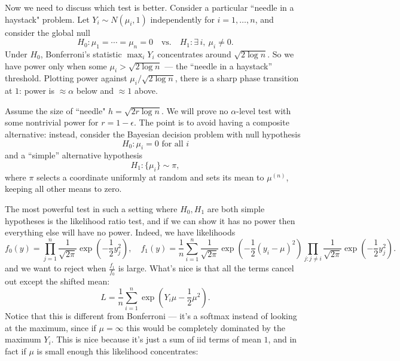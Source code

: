 Now we need to discuss which test is better. Consider a particular ``needle in a haystack" problem. 
Let $Y_i \sim N(\mu_i, 1)$ independently for $i = 1, \ldots, n$, and consider the global null
\[
H_0 : \mu_1 = \cdots = \mu_n = 0 \quad \text{vs.} \quad H_1 : \exists\, i,\ \mu_i \neq 0.
\]
Under $H_0$, Bonferroni's statistic $\max_i Y_i$ concentrates around $\sqrt{2 \log n}$. So we have power only when some $\mu_i > \sqrt{2 \log n}$ — the ``needle in a haystack'' threshold. Plotting power against $\mu_i / \sqrt{2 \log n}$, there is a sharp phase transition at $1$: power is $\approx \alpha$ below and $\approx 1$ above.

Assume the size of ``needle" $h = \sqrt{2r\log n}$. We will prove no $\alpha$-level test with some nontrivial power for $r=1-\epsilon$. The point is to avoid having a composite alternative: instead, consider the Bayesian decision problem with null hypothesis
\[
H_0 : \mu_i = 0 \text{ for all } i
\]
and a ``simple'' alternative hypothesis
\[
H_1 : \{\mu_i\} \sim \pi,
\]
where $\pi$ selects a coordinate uniformly at random and sets its mean to $\mu^{(n)}$, keeping all other means to zero.

The most powerful test in such a setting where $H_0, H_1$ are both simple hypotheses is the likelihood ratio test, and if we can show it has no power then everything else will have no power. Indeed, we have likelihoods
\[
f_0(y) = \prod_{j=1}^{n} \frac{1}{\sqrt{2\pi}} \exp\left(-\frac{1}{2} y_j^2\right), \quad f_1(y) = \frac{1}{n} \sum_{i=1}^{n} \frac{1}{\sqrt{2\pi}} \exp\left(-\frac{1}{2}(y_i - \mu)^2\right) \prod_{j : j \neq i} \frac{1}{\sqrt{2\pi}} \exp\left(-\frac{1}{2} y_j^2\right).
\]
and we want to reject when $\frac{f_1}{f_0}$ is large. What's nice is that all the terms cancel out except the shifted mean:
\[
L = \frac{1}{n} \sum_{i=1}^{n} \exp\left(Y_i \mu - \frac{1}{2} \mu^2\right).
\]
Notice that this is different from Bonferroni — it's a softmax instead of looking at the maximum, since if $\mu = \infty$ this would be completely dominated by the maximum $Y_i$. This is nice because it's just a sum of iid terms of mean $1$, and in fact if $\mu$ is small enough this likelihood concentrates:

